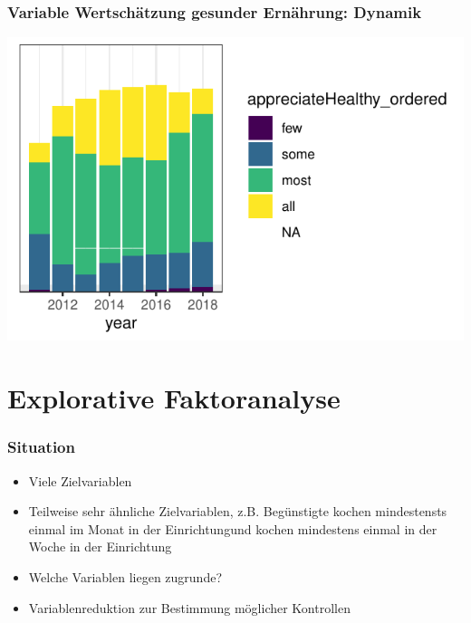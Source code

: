 \begin{frame}[fragile]
\frametitle{Variable \glqq Wertschätzung gesunder Ernährung\grqq: Dynamik}
\begin{knitrout}\footnotesize
{}\color{fgcolor}

{\centering \includegraphics[width=\maxwidth]{figure/beamer-appreciateTime-1} 

}



\end{knitrout}
\end{frame}

\section{Explorative Faktoranalyse}

\begin{frame}[fragile]
\frametitle{Situation}

\begin{itemize}
 \item<1-> Viele Zielvariablen 
 \item<2-> Teilweise sehr ähnliche Zielvariablen, z.B. Begünstigte \glqq kochen mindestensts einmal im Monat in der Einrichtung\grqq und \glqq kochen mindestens einmal in der Woche in der Einrichtung\grqq
 \item<3-> Welche Variablen liegen zugrunde?
 \item<4-> Variablenreduktion zur Bestimmung möglicher Kontrollen
\end{itemize}

\end{frame}


